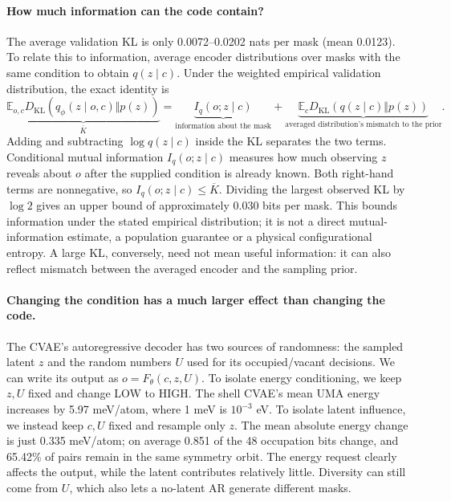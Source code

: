 \documentclass{article}
\newcommand{\KL}{D_{\mathrm{KL}}}
\newcommand{\E}{\mathbb E}
\begin{document}
\paragraph{How much information can the code contain?}
The average validation KL is only 0.0072--0.0202 nats per mask (mean 0.0123).
To relate this to information, average encoder distributions over masks with
the same condition to obtain $q(z\mid c)$. Under the weighted empirical
validation distribution, the exact identity is
\begin{equation}
\underbrace{\E_{o,c}\KL(q_\phi(z\mid o,c)\Vert p(z))}_{\overline K}
=\underbrace{I_q(o;z\mid c)}_{\text{information about the mask}}
+\underbrace{\E_c\KL(q(z\mid c)\Vert p(z))}_{\text{averaged distribution's mismatch to the prior}}.
\label{eq:mi}
\end{equation}
Adding and subtracting $\log q(z\mid c)$ inside the KL separates the two terms.
Conditional mutual information $I_q(o;z\mid c)$ measures how much observing $z$
reveals about $o$ after the supplied condition is already known. Both right-hand
terms are nonnegative, so $I_q(o;z\mid c)\le\overline K$. Dividing the largest
observed KL by $\log 2$ gives an upper bound of approximately 0.030 bits per
mask. This bounds information under the stated empirical distribution; it is
not a direct mutual-information estimate, a population guarantee or a physical
configurational entropy. A large KL, conversely, need not mean useful information:
it can also reflect mismatch between the averaged encoder and the sampling prior.

\paragraph{Changing the condition has a much larger effect than changing the code.}
The CVAE's autoregressive decoder has two sources of randomness: the sampled latent
$z$ and the random numbers $U$ used for its occupied/vacant decisions. We can
write its output as $o=F_\theta(c,z,U)$. To isolate energy conditioning, we keep
$z,U$ fixed and change LOW to HIGH. The shell CVAE's mean UMA energy increases
by 5.97 meV/atom, where 1 meV is $10^{-3}$ eV. To isolate latent influence, we
instead keep $c,U$ fixed and resample only $z$. The mean absolute energy change
is just 0.335 meV/atom; on average 0.851 of the 48 occupation bits change, and
65.42\% of pairs remain in the same symmetry orbit. The energy request clearly
affects the output, while the latent contributes relatively little. Diversity
can still come from $U$, which also lets a no-latent AR generate different masks.
\end{document}
